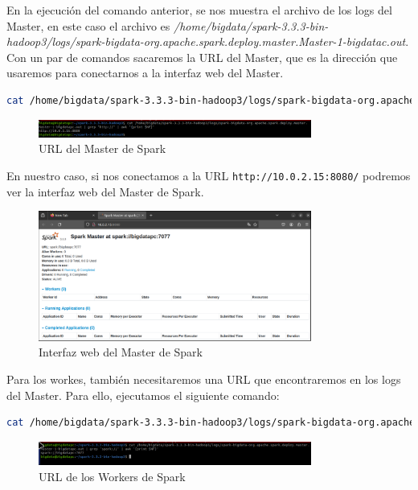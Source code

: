 En la ejecución del comando anterior, se nos muestra el archivo de los logs del Master, en este caso el archivo es \textit{/home/bigdata/spark-3.3.3-bin-hadoop3/logs/spark-bigdata-org.apache.spark.deploy.master.Master-1-bigdatac.out}. Con un par de comandos sacaremos la URL del Master, que es la dirección que usaremos para conectarnos a la interfaz web del Master.

\begin{lstlisting}[language=bash]
    cat /home/bigdata/spark-3.3.3-bin-hadoop3/logs/spark-bigdata-org.apache.spark.deploy.master.Master-1-bigdatac.out | grep 'http://' | awk '{print $NF}'
\end{lstlisting}

\begin{figure}[H]
    \centering
    \includegraphics[width=0.8\textwidth]{figures/16.png}
    \caption{URL del Master de Spark}
\end{figure}

En nuestro caso, si nos conectamos a la URL \texttt{http://10.0.2.15:8080/} podremos ver la interfaz web del Master de Spark.

\begin{figure}[H]
    \centering
    \includegraphics[width=0.8\textwidth]{figures/17.png}
    \caption{Interfaz web del Master de Spark}
\end{figure}

Para los workes, también necesitaremos una URL que encontraremos en los logs del Master. Para ello, ejecutamos el siguiente comando:

\begin{lstlisting}[language=bash]
    cat /home/bigdata/spark-3.3.3-bin-hadoop3/logs/spark-bigdata-org.apache.spark.deploy.master.Master-1-bigdatac.out | grep 'spark://' | awk '{print $NF}'
\end{lstlisting}

\begin{figure}[H]
    \centering
    \includegraphics[width=0.8\textwidth]{figures/18.png}
    \caption{URL de los Workers de Spark}
\end{figure}

